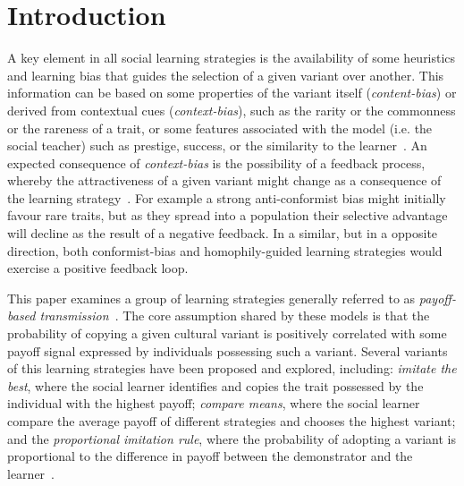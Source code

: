 \documentclass[preprint,authoryear]{elsarticle}
\begin{document}
\section{Introduction}

A key element in all social learning strategies is the availability of some heuristics and learning bias that guides the selection of a given variant over another. This information can be based on some properties of the variant itself (\emph{content-bias}) or derived from contextual cues (\emph{context-bias}), such as the rarity or the commonness or the rareness of a trait, or some features associated with the model (i.e. the social teacher) such as prestige, success, or the similarity to the learner~\citep{henrich_mcelreath2003}. An expected consequence of \emph{context-bias} is the possibility of a feedback process, whereby the attractiveness of a given variant might change as a consequence of the learning strategy~\citep{kendal_etal_2009}. For example a strong anti-conformist bias might initially favour rare traits, but as they spread into a population their selective advantage will decline as the result of a negative feedback. In a similar, but in a opposite direction, both conformist-bias and homophily-guided learning strategies would exercise a positive feedback loop.  %

This paper examines a group of learning strategies generally referred to as \emph{payoff-based transmission}~\citep{schlag1998,kendal_etal_2009,lake_and_crema_2012,baldini2013,kandler_and_laland_2013,crema_lake_inpress}. The core assumption shared by these models is that the probability of copying a given cultural variant is positively correlated with some payoff signal expressed by individuals possessing such a variant. Several variants of this learning strategies have been proposed and explored, including: \emph{imitate the best}, where the social learner identifies and copies the trait possessed by the individual with the highest payoff; \emph{compare means}, where the social learner compare the average payoff of different strategies and chooses the highest variant; and the \emph{proportional imitation rule}, where the probability of adopting a variant is proportional to the difference in payoff between the demonstrator and the learner~\citep{schlag1998,baldini2013}. 
\end{document}
